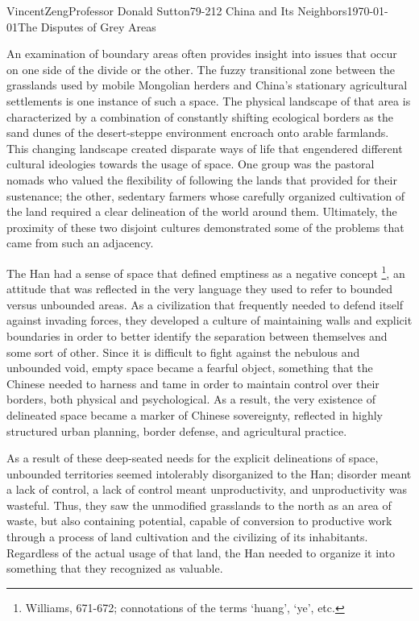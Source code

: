 \documentclass{article}[12pt]
\begin{document}
\begin{mla}{Vincent}{Zeng}{Professor Donald Sutton}{79-212 China and Its Neighbors}{\today}{The Disputes of Grey Areas}

	An examination of boundary areas often provides insight into issues
	that occur on one side of the divide or the other. The fuzzy
	transitional zone between the grasslands used by mobile Mongolian herders and
	China's stationary agricultural settlements is one instance of
	such a space.  The physical landscape of that area is characterized by
	a combination of constantly shifting ecological borders as the sand
	dunes of the desert-steppe environment encroach onto arable farmlands.
	This changing landscape created disparate ways of life that engendered
	different cultural ideologies towards the usage of space. One group
	was the pastoral nomads who valued the flexibility of
	following the lands that provided for their sustenance; the other,
	sedentary farmers whose carefully organized cultivation of the land
	required a clear delineation of the world around them. Ultimately, the
	proximity of these two disjoint cultures demonstrated some of the
	problems that came from such an adjacency.

	The Han had a sense of space that defined emptiness as a
	negative concept \footnote{Williams, 671-672; connotations of the terms `huang', `ye', etc.}, an attitude that was
	reflected in the very language they used to refer to bounded versus
	unbounded areas. As a civilization that frequently needed to defend itself
	against invading forces, they developed a culture of maintaining walls and
	explicit boundaries in order to better identify the
	separation between themselves and some sort of other. Since it is difficult to
	fight against the nebulous and unbounded void, empty space became a
	fearful object, something that the Chinese needed to harness and
	tame in order to maintain control over their borders, both physical and
	psychological. As a result, the very existence of delineated space
	became a marker of Chinese sovereignty, reflected in highly structured
	urban planning, border defense, and agricultural practice.

	As a result of  these deep-seated needs for the explicit delineations
	of space, unbounded territories seemed intolerably disorganized to the
	Han; disorder meant a lack of control, a lack of control meant
	unproductivity, and unproductivity was wasteful.  Thus, they saw the
	unmodified grasslands to the north as an area of
	waste, but also containing potential, capable of conversion to productive work through a
	process of land cultivation and the civilizing of its inhabitants.
	Regardless of the actual usage of that land, the Han needed to
	organize it into something that they recognized as valuable.


\end{mla}
\end{document}
